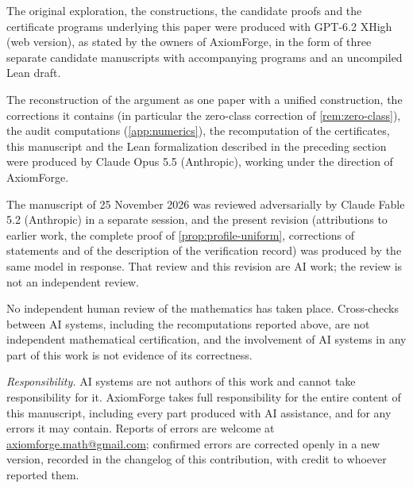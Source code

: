 
The original exploration, the constructions, the candidate proofs and the certificate programs underlying this paper were produced with GPT-6.2 XHigh (web version), as stated by the owners of AxiomForge, in the form of three separate candidate manuscripts with accompanying programs and an uncompiled Lean draft.

The reconstruction of the argument as one paper with a unified construction, the corrections it contains (in particular the zero-class correction of \cref{rem:zero-class}), the audit computations (\cref{app:numerics}), the recomputation of the certificates, this manuscript and the Lean formalization described in the preceding section were produced by Claude Opus 5.5 (Anthropic), working under the direction of AxiomForge.

The manuscript of 25 November 2026 was reviewed adversarially by Claude Fable 5.2 (Anthropic) in a separate session, and the present revision (attributions to earlier work, the complete proof of \cref{prop:profile-uniform}, corrections of statements and of the description of the verification record) was produced by the same model in response. That review and this revision are AI work; the review is not an independent review.

No independent human review of the mathematics has taken place. Cross-checks between AI systems, including the recomputations reported above, are not independent mathematical certification, and the involvement of AI systems in any part of this work is not evidence of its correctness.

\emph{Responsibility.} AI systems are not authors of this work and cannot take responsibility
for it. AxiomForge takes full responsibility for the entire content of this manuscript,
including every part produced with AI assistance, and for any errors it may contain. Reports
of errors are welcome at \href{mailto:axiomforge.math@gmail.com}{axiomforge.math@gmail.com};
confirmed errors are corrected openly in a new version, recorded in the changelog of this
contribution, with credit to whoever reported them.
